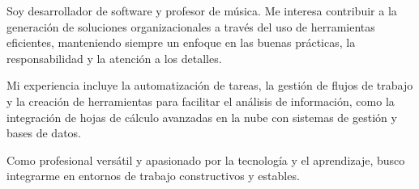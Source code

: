

\begin{cvparagraph}

  Soy desarrollador de software y profesor de música. Me interesa contribuir a
  la generación de soluciones organizacionales a través del uso de herramientas
  eficientes, manteniendo siempre un enfoque en las buenas prácticas, la
  responsabilidad y la atención a los detalles.

  Mi experiencia incluye la automatización de tareas, la gestión de flujos de
  trabajo y la creación de herramientas para facilitar el análisis de
  información, como la integración de hojas de cálculo avanzadas en la nube con
  sistemas de gestión y bases de datos.

  Como profesional versátil y apasionado por la tecnología y el aprendizaje,
  busco integrarme en entornos de trabajo constructivos y estables.

\end{cvparagraph}

